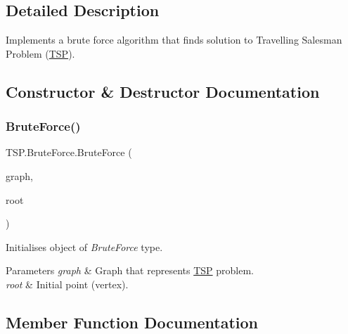 \subsection{Detailed Description}
Implements a brute force algorithm that finds solution to Travelling Salesman Problem (\hyperlink{namespace_t_s_p}{T\+SP}). 



\subsection{Constructor \& Destructor Documentation}
\mbox{\label{class_t_s_p_1_1_brute_force_a48f806b378163a3ac35a9896cbd79b55}} 
\subsubsection{\texorpdfstring{Brute\+Force()}{BruteForce()}}
{\footnotesize\ttfamily T\+S\+P.\+Brute\+Force.\+Brute\+Force (\begin{DoxyParamCaption}\item[{Graph}]{graph,  }\item[{string}]{root }\end{DoxyParamCaption})\hspace{0.3cm}{\ttfamily [inline]}}



Initialises object of {\itshape Brute\+Force}  type. 


\begin{DoxyParams}{Parameters}
{\em graph} & Graph that represents \hyperlink{namespace_t_s_p}{T\+SP} problem.\\
\hline
{\em root} & Initial point (vertex).\\
\hline
\end{DoxyParams}


\subsection{Member Function Documentation}
\mbox{\label{class_t_s_p_1_1_brute_force_a80b9e44311d861a66005ef546b82fd9a}} 
